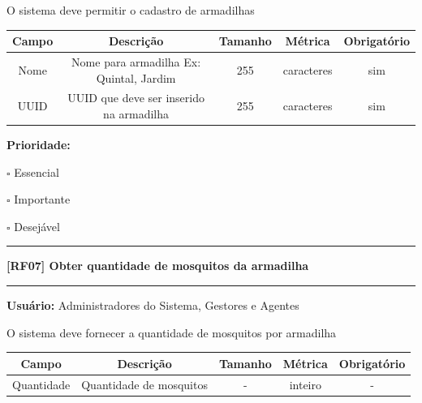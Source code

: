 \documentclass{scrreprt}
\begin{document}
	O sistema deve permitir o cadastro de armadilhas
	
	\begin{center}
		\begin{adjustbox}{width=\textwidth}      \begin{tabular}{ |c|c|c|c|c| } 
			\hline
			\rowcolor{lightgray} Campo & Descrição & Tamanho & Métrica & Obrigatório \\
			\hline
			Nome & Nome para armadilha Ex: Quintal, Jardim & 255 & caracteres & sim \\ 
			\hline  
			UUID & UUID que deve ser inserido na armadilha & 255 & caracteres & sim \\ 
			\hline  
		\end{tabular}    \end{adjustbox}
	\end{center}
	
	\textbf{Prioridade: }\begin{itemize*}
		\item[\hspace{1cm}\rlap{\raisebox{0.2ex}{\hspace{0.4ex}\scriptsize \ding{56}}}$\square$]
		Essencial
		\item[\hspace{1cm}$\square$]
		Importante
		\item[\hspace{1cm}$\square$]
		Desejável
	\end{itemize*}
	\begin{center}
		\noindent\rule{16cm}{0.4pt}
		\textbf{[RF07] Obter quantidade de mosquitos da armadilha}
		\noindent\rule{16cm}{0.4pt}
	\end{center}
	\textbf{Usuário:} Administradores do Sistema, Gestores e Agentes
	
	O sistema deve fornecer a quantidade de mosquitos por armadilha
	
	\begin{center}
		\begin{adjustbox}{width=\textwidth}      \begin{tabular}{ |c|c|c|c|c| } 
			\hline
			\rowcolor{lightgray} Campo & Descrição & Tamanho & Métrica & Obrigatório \\
			\hline
			Quantidade & Quantidade de mosquitos & - & inteiro & - \\    
			\hline 
		\end{tabular}    \end{adjustbox}
	\end{center}
	
\end{document}
